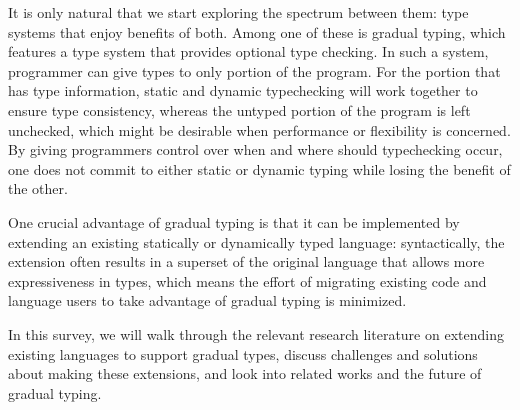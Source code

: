 It is only natural that we start exploring the spectrum between them:
type systems that enjoy benefits of both.
Among one of these is gradual typing, which features a type system
that provides optional type checking.
In such a system, programmer can
give types to only portion of the program.
For the portion that has type information,
static and dynamic typechecking will work together
to ensure type consistency, whereas
the untyped portion of the program is left unchecked,
which might be desirable
when performance or flexibility is concerned.
By giving programmers control over when and where should typechecking
occur, one does not commit to either static or dynamic typing
while losing the benefit of the other.

One crucial advantage of gradual typing is that it can be implemented
by extending an existing statically or dynamically typed language:
syntactically, the extension often results in a superset of the original
language that allows more expressiveness in types, which means
the effort of migrating existing code and language users
to take advantage of gradual typing is minimized.

In this survey, we will walk through the relevant research literature on extending
existing languages to support gradual types,
discuss challenges and solutions about making these extensions,
and look into related works and the future of gradual typing.
